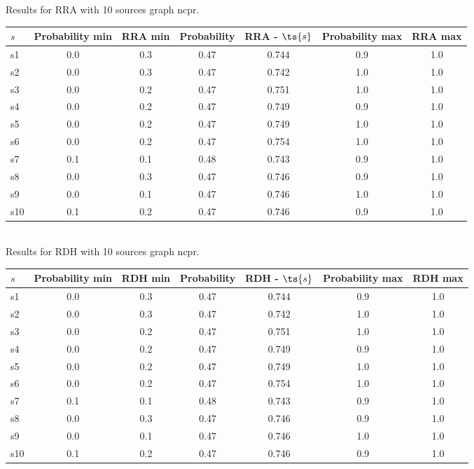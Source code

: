 \documentclass{article}
\begin{document}
\noindent Results for RRA with 10 sources graph ncpr.

\noindent\begin{tabular}{|l|c|c|c|c|c|c|}
\hline
$s$& Probability min & RRA min & Probability & RRA - $\ts{s}$ & Probability max & RRA max\\
\hline
s1 &0.0 & 0.3 & 0.47 & 0.744 & 0.9 & 1.0\\
\hline
s2 &0.0 & 0.3 & 0.47 & 0.742 & 1.0 & 1.0\\
\hline
s3 &0.0 & 0.2 & 0.47 & 0.751 & 1.0 & 1.0\\
\hline
s4 &0.0 & 0.2 & 0.47 & 0.749 & 0.9 & 1.0\\
\hline
s5 &0.0 & 0.2 & 0.47 & 0.749 & 1.0 & 1.0\\
\hline
s6 &0.0 & 0.2 & 0.47 & 0.754 & 1.0 & 1.0\\
\hline
s7 &0.1 & 0.1 & 0.48 & 0.743 & 0.9 & 1.0\\
\hline
s8 &0.0 & 0.3 & 0.47 & 0.746 & 0.9 & 1.0\\
\hline
s9 &0.0 & 0.1 & 0.47 & 0.746 & 1.0 & 1.0\\
\hline
s10 &0.1 & 0.2 & 0.47 & 0.746 & 0.9 & 1.0\\
\hline
\end{tabular}\\

\noindent Results for RDH with 10 sources graph ncpr.

\noindent\begin{tabular}{|l|c|c|c|c|c|c|}
\hline
$s$& Probability min & RDH min & Probability & RDH - $\ts{s}$ & Probability max & RDH max\\
\hline
s1 &0.0 & 0.3 & 0.47 & 0.744 & 0.9 & 1.0\\
\hline
s2 &0.0 & 0.3 & 0.47 & 0.742 & 1.0 & 1.0\\
\hline
s3 &0.0 & 0.2 & 0.47 & 0.751 & 1.0 & 1.0\\
\hline
s4 &0.0 & 0.2 & 0.47 & 0.749 & 0.9 & 1.0\\
\hline
s5 &0.0 & 0.2 & 0.47 & 0.749 & 1.0 & 1.0\\
\hline
s6 &0.0 & 0.2 & 0.47 & 0.754 & 1.0 & 1.0\\
\hline
s7 &0.1 & 0.1 & 0.48 & 0.743 & 0.9 & 1.0\\
\hline
s8 &0.0 & 0.3 & 0.47 & 0.746 & 0.9 & 1.0\\
\hline
s9 &0.0 & 0.1 & 0.47 & 0.746 & 1.0 & 1.0\\
\hline
s10 &0.1 & 0.2 & 0.47 & 0.746 & 0.9 & 1.0\\
\hline
\end{tabular}\\
\end{document}
